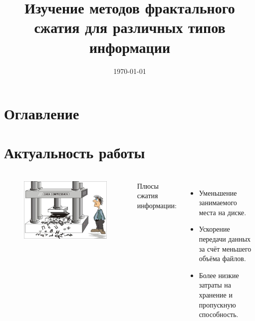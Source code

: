 \documentclass[t aspectratio=169]{beamer}
\title{Изучение методов фрактального сжатия для различных типов информации}
\date{\today}
\begin{document}
  \begin{frame}
    \maketitle
  \end{frame}

  \section*{Оглавление}
  \begin{frame}\frametitle{\insertsection}
    \large
    \tableofcontents
    \normalfont
  \end{frame}

  \section{Актуальность работы}
  \begin{frame}\frametitle{\insertsection}
    \begin{columns}
      \begin{figure}
        \begin{center}
          \includegraphics[width=1\textwidth]{./images/compression-illustration.jpg}
        \end{center}
      \end{figure}
      \large Плюсы сжатия информации:
      \begin{itemize}
        \item Уменьшение занимаемого места на диске.
        \item Ускорение передачи данных за счёт меньшего объёма файлов.
        \item Более низкие затраты на хранение и пропускную способность.
      \end{itemize}
    \normalsize
    \end{columns}
  \end{frame}
\end{document}
